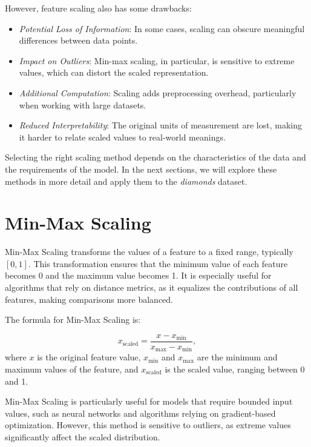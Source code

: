 \documentclass[
  11pt,
]{book}
\providecommand{\tightlist}{%
  \setlength{\itemsep}{0pt}\setlength{\parskip}{0pt}}
\theoremstyle{definition}
\theoremstyle{definition}
\theoremstyle{definition}
\theoremstyle{definition}
\theoremstyle{remark}
\begin{document}
However, feature scaling also has some drawbacks:

\begin{itemize}
\tightlist
\item
  \emph{Potential Loss of Information}: In some cases, scaling can obscure meaningful differences between data points.
\item
  \emph{Impact on Outliers}: Min-max scaling, in particular, is sensitive to extreme values, which can distort the scaled representation.
\item
  \emph{Additional Computation}: Scaling adds preprocessing overhead, particularly when working with large datasets.
\item
  \emph{Reduced Interpretability}: The original units of measurement are lost, making it harder to relate scaled values to real-world meanings.
\end{itemize}

Selecting the right scaling method depends on the characteristics of the data and the requirements of the model. In the next sections, we will explore these methods in more detail and apply them to the \emph{diamonds} dataset.

\section{Min-Max Scaling}\label{min-max-scaling}

Min-Max Scaling transforms the values of a feature to a fixed range, typically \([0, 1]\). This transformation ensures that the minimum value of each feature becomes 0 and the maximum value becomes 1. It is especially useful for algorithms that rely on distance metrics, as it equalizes the contributions of all features, making comparisons more balanced.

The formula for Min-Max Scaling is:

\[
x_{\text{scaled}} = \frac{x - x_{\text{min}}}{x_{\text{max}} - x_{\text{min}}},
\]
where \(x\) is the original feature value, \(x_{\text{min}}\) and \(x_{\text{max}}\) are the minimum and maximum values of the feature, and \(x_{\text{scaled}}\) is the scaled value, ranging between 0 and 1.

Min-Max Scaling is particularly useful for models that require bounded input values, such as neural networks and algorithms relying on gradient-based optimization. However, this method is sensitive to outliers, as extreme values significantly affect the scaled distribution.
\end{document}
